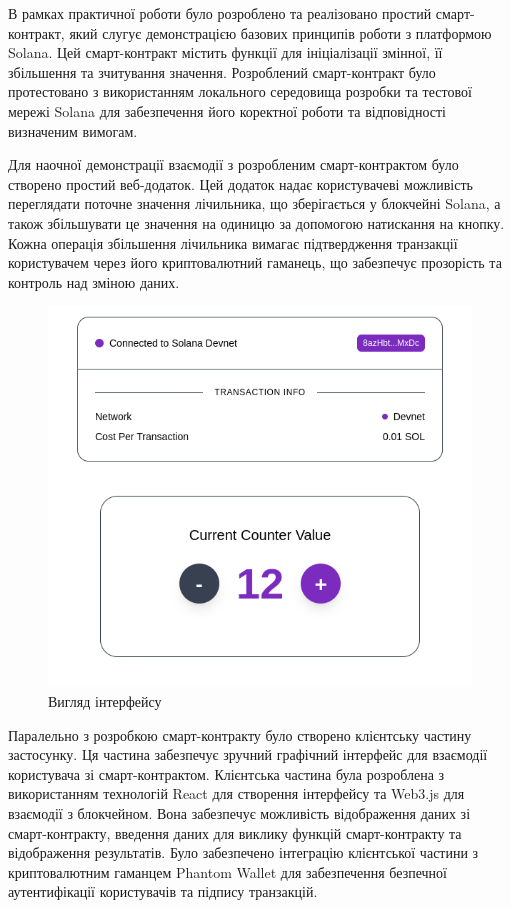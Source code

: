 \documentclass[14pt]{extreport}
\begin{document}
В рамках практичної роботи було розроблено та реалізовано простий смарт-контракт, який слугує демонстрацією базових принципів роботи з платформою Solana. Цей смарт-контракт містить функції для ініціалізації змінної, її збільшення та зчитування значення. Розроблений смарт-контракт було протестовано з використанням локального середовища розробки та тестової мережі Solana для забезпечення його коректної роботи та відповідності визначеним вимогам.

Для наочної демонстрації взаємодії з розробленим смарт-контрактом було створено простий веб-додаток. Цей додаток надає користувачеві можливість переглядати поточне значення лічильника, що зберігається у блокчейні Solana, а також збільшувати це значення на одиницю за допомогою натискання на кнопку. Кожна операція збільшення лічильника вимагає підтвердження транзакції користувачем через його криптовалютний гаманець, що забезпечує прозорість та контроль над зміною даних.

\begin{figure}[H]
	\centering
	\includegraphics[scale=0.5]{1}
	\caption{Вигляд інтерфейсу}
\end{figure}

Паралельно з розробкою смарт-контракту було створено клієнтську частину застосунку. Ця частина забезпечує зручний графічний інтерфейс для взаємодії користувача зі смарт-контрактом. Клієнтська частина була розроблена з використанням технологій React для створення інтерфейсу та Web3.js для взаємодії з блокчейном. Вона забезпечує можливість відображення даних зі смарт-контракту, введення даних для виклику функцій смарт-контракту та відображення результатів. Було забезпечено інтеграцію клієнтської частини з криптовалютним гаманцем Phantom Wallet для забезпечення безпечної аутентифікації користувачів та підпису транзакцій.
\end{document}
